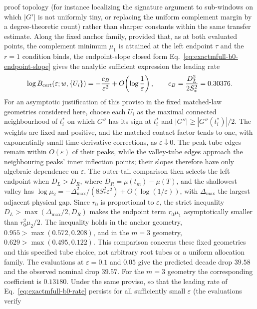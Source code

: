 \begin{remark}
proof topology (for instance localizing the signature argument to
sub-windows on which \(|G'|\) is not uniformly tiny, or replacing the
uniform complement margin by a degree-theoretic count) rather than sharper
constants within the same transfer estimate.  Along the fixed
anchor family, provided that, as at both evaluated points, the complement
minimum \(\mu_1\) is attained at the left endpoint \(\tau\) and the \(r=1\)
condition binds, the endpoint-slope closed form
Eq.~\eqref{eq:exactmfull-b0-endpoint-slope} gives the analytic sufficient
expression the leading rate
\begin{equation}
 \log B_{\rm cert}(\varepsilon;w,\{U_i\})
 =-\frac{c_B}{\varepsilon^2}
  +O\!\left(\log\frac1\varepsilon\right),
 \qquad
 c_B=\frac{D_L^2}{2S_*^2}=0.30376.
 \label{eq:exactmfull-b0-rate}
\end{equation}
For an asymptotic justification of this proviso in the fixed matched-law
geometries considered here, choose each \(U_i\) as the maximal connected
neighbourhood of \(t_i^*\) on which \(G''\) has its sign at \(t_i^*\) and
\(|G''|\ge|G''(t_i^*)|/2\).  The weights are fixed and positive, and the
matched contact factor tends to one, with exponentially small
time-derivative corrections, as \(\varepsilon\downarrow0\).  The peak-tube
edges remain within \(O(\varepsilon)\) of their peaks, while the
valley-tube edges approach the neighbouring peaks' inner inflection points;
their slopes therefore have only algebraic dependence on \(\varepsilon\).
The outer-tail comparison then selects the left endpoint when \(D_L>D_R\),
where \(D_R=\mu(t_m)-\mu(T)\), and the shallowest valley has
\(\log\mu_2=-\Delta_{\max}^2/(8S_*^2\varepsilon^2)+O(\log(1/\varepsilon))\),
with \(\Delta_{\max}\) the largest adjacent physical gap.  Since \(r_0\)
is proportional to \(\varepsilon\), the strict inequality
\(D_L>\max(\Delta_{\max}/2,D_R)\) makes the endpoint term \(r_0\mu_1\)
asymptotically smaller than \(r_0^2\mu_2/2\).  The inequality holds in the
anchor geometry, \(0.955>\max(0.572,0.208)\), and in the \(m=3\) geometry,
\(0.629>\max(0.495,0.122)\).  This comparison concerns these fixed
geometries and this specified tube choice, not arbitrary root tubes or a
uniform allocation family.
The evaluations at \(\varepsilon=0.1\) and \(0.05\) give the predicted
decade drop \(39.58\) and the observed nominal drop \(39.57\).  For the
\(m=3\) geometry the corresponding coefficient is \(0.13180\).  Under the
same proviso, so that the leading rate of Eq.~\eqref{eq:exactmfull-b0-rate}
persists for all sufficiently small \(\varepsilon\) (the evaluations verify

\end{remark}
